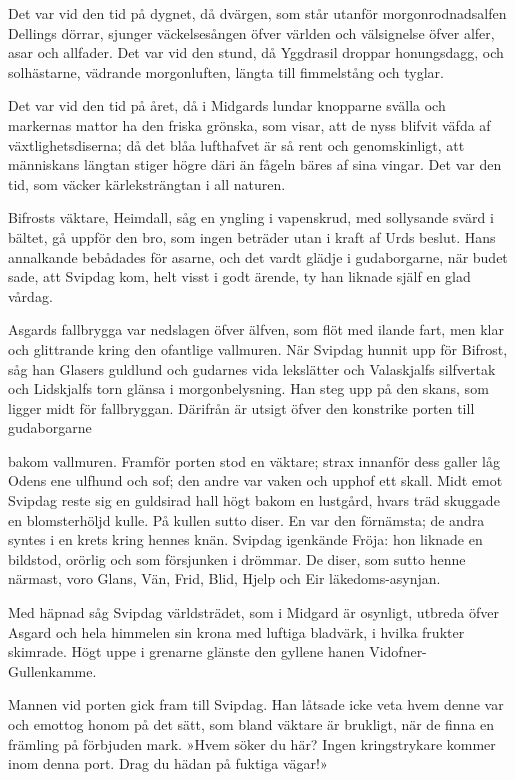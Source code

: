 Det var vid den tid på dygnet, då dvärgen, som står utanför
morgonrodnadsalfen Dellings dörrar, sjunger väckelsesången öfver världen
och välsignelse öfver alfer, asar och allfader. Det var vid den stund,
då Yggdrasil droppar honungsdagg, och solhästarne, vädrande
morgonluften, längta till fimmelstång och tyglar.

Det var vid den tid på året, då i Midgards lundar knopparne svälla och
markernas mattor ha den friska grönska, som visar, att de nyss blifvit
väfda af växtlighetsdiserna; då det blåa lufthafvet är så rent och
genomskinligt, att människans längtan stiger högre däri än fågeln bäres
af sina vingar. Det var den tid, som väcker kärleksträngtan i all
naturen.

Bifrosts väktare, Heimdall, såg en yngling i vapenskrud, med sollysande
svärd i bältet, gå uppför den bro, som ingen beträder utan i kraft af
Urds beslut. Hans annalkande bebådades för asarne, och det vardt glädje
i gudaborgarne, när budet sade, att Svipdag kom, helt visst i godt
ärende, ty han liknade själf en glad vårdag.

Asgards fallbrygga var nedslagen öfver älfven, som flöt med ilande fart,
men klar och glittrande kring den ofantlige vallmuren. När Svipdag
hunnit upp för Bifrost, såg han Glasers guldlund och gudarnes vida
lekslätter och Valaskjalfs silfvertak och Lidskjalfs torn glänsa i
morgonbelysning. Han steg upp på den skans, som ligger midt för
fallbryggan. Därifrån är utsigt öfver den konstrike porten till
gudaborgarne

bakom vallmuren. Framför porten stod en väktare; strax innanför dess
galler låg Odens ene ulfhund och sof; den andre var vaken och upphof ett
skall. Midt emot Svipdag reste sig en guldsirad hall högt bakom en
lustgård, hvars träd skuggade en blomsterhöljd kulle. På kullen sutto
diser. En var den förnämsta; de andra syntes i en krets kring hennes
knän. Svipdag igenkände Fröja: hon liknade en bildstod, orörlig och som
försjunken i drömmar. De diser, som sutto henne närmast, voro Glans,
Vän, Frid, Blid, Hjelp och Eir läkedoms-asynjan.

Med häpnad såg Svipdag världsträdet, som i Midgard är osynligt, utbreda
öfver Asgard och hela himmelen sin krona med luftiga bladvärk, i hvilka
frukter skimrade. Högt uppe i grenarne glänste den gyllene hanen
Vidofner-Gullenkamme.

Mannen vid porten gick fram till Svipdag. Han låtsade icke veta hvem
denne var och emottog honom på det sätt, som bland väktare är brukligt,
när de finna en främling på förbjuden mark. »Hvem söker du här? Ingen
kringstrykare kommer inom denna port. Drag du hädan på fuktiga vägar!»

